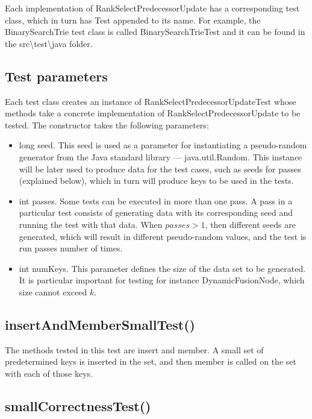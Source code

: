 Each implementation of {\ttfamily RankSelectPredecessorUpdate} has a corresponding test class, which in turn has {\ttfamily Test} appended to its name. For example, the {\ttfamily BinarySearchTrie} test class is called {\ttfamily BinarySearchTrieTest} and it can be found in the {\ttfamily src\textbackslash test\textbackslash java} folder.

\subsection{Test parameters}

Each test class creates an instance of {\ttfamily RankSelectPredecessorUpdateTest} whose methods take a concrete implementation of {\ttfamily RankSelectPredecessorUpdate} to be tested. The constructor takes the following parameters:

\begin{itemize}
    \item {\ttfamily long seed}. This seed is used as a parameter for instantiating a pseudo-random generator from the Java standard library --- {\ttfamily java.util.Random}. This instance will be later used to produce data for the test cases, such as seeds for passes (explained below), which in turn will produce keys to be used in the tests.
    \item {\ttfamily int passes}. Some tests can be executed in more than one pass. A pass in a particular test consists of generating data with its corresponding seed and running the test with that data. When $passes > 1$, then different seeds are generated, which will result in different pseudo-random values, and the test is run {\ttfamily passes} number of times.
    \item {\ttfamily int numKeys}. This parameter defines the size of the data set to be generated. It is particular important for testing for instance {\ttfamily DynamicFusionNode}, which size cannot exceed $k$.
\end{itemize}

\subsection{{\ttfamily insertAndMemberSmallTest()}}
The methods tested in this test are {\ttfamily insert} and {\ttfamily member}. A small set of predetermined keys is inserted in the set, and then {\ttfamily member} is called on the set with each of those keys. 

\subsection{{\ttfamily smallCorrectnessTest()}}

